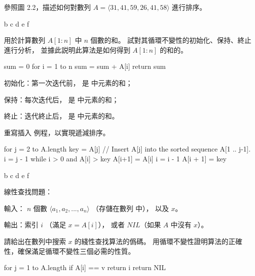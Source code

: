 \startsection[
  title={Insertion sort},
]

\startEXERCISE
參照圖 2.2，描述如何對數列 $A = \langle 31, 41, 59, 26, 41, 58\rangle$ 進行排序。
\stopEXERCISE

\startANSWER
{}
{\externalfigure[output/e2_1_1-2]}{b}
{\externalfigure[output/e2_1_1-3]}{c}
{\externalfigure[output/e2_1_1-4]}{d}
{\externalfigure[output/e2_1_1-5]}{e}
{\externalfigure[output/e2_1_1-6]}{f}
\stopcombination
\stopANSWER

\startEXERCISE
{} 用於計算數列 $A[1:n]$ 中 $n$ 個數的和。
試對其循環不變性的初始化、保持、終止進行分析，
並據此説明此算法是如何得到 $A[1:n]$ 的和的。

\startCLRS
sum = 0
for i = 1 to n
	sum = sum + A[i]
return sum
\stopCLRS
\stopEXERCISE

\startANSWER
\startigBase
\item 初始化：第一次迭代前，  是  中元素的和；
\item 保持：每次迭代后，  是  中元素的和；
\item 終止：迭代終止后，  是  中元素的和。
\stopigBase
\stopANSWER

\startEXERCISE
重寫插入 例程，以實現遞減排序。
\stopEXERCISE
\startANSWER

\startCLRS
for j = 2 to A.length
	key = A[j]
	// Insert A[j] into the sorted sequence A[1 .. j-1].
	i = j - 1
	while i > 0 and A[i] > key
		A[i+1] = A[i]
		i = i - 1
	A[i + 1] = key
\stopCLRS

{\externalfigure[output/e2_1_2-2]}{b}
{\externalfigure[output/e2_1_2-3]}{c}
{\externalfigure[output/e2_1_2-4]}{d}
{\externalfigure[output/e2_1_2-5]}{e}
{\externalfigure[output/e2_1_2-6]}{f}
\stopcombination
\stopANSWER

線性查找問題：

輸入： $n$ 個數 $\langle a_1, a_2, ..., a_n \rangle$ （存儲在數列  中），
以及 $x$。

輸出：索引 $i$ （滿足 $x = A[i]$），
或者 $NIL$（如果 $A$ 中沒有 $x$）。

請給出在數列中搜索 $x$ 的綫性查找算法的僞碼。
用循環不變性證明算法的正確性，確保滿足循環不變性三個必需的性質。
\stopEXERCISE

\startANSWER
\startCLRS
for j = 1 to A.length
	if A[i] == v
		return i
return NIL
\stopCLRS
\stopANSWER

